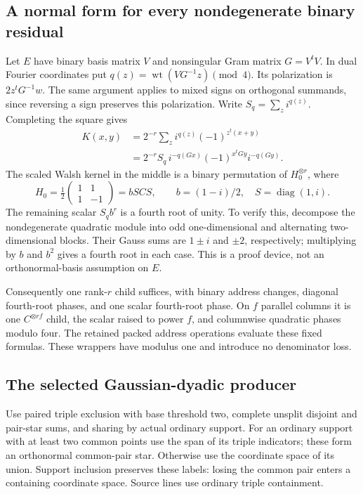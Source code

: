 \subsection{A normal form for every nondegenerate binary residual}
Let $E$ have binary basis matrix $V$ and nonsingular Gram matrix
$G=V^tV$. In dual Fourier coordinates put
$q(z)=\operatorname{wt}(VG^{-1}z)\pmod4$.
Its polarization is $2z^tG^{-1}w$. The same argument applies to mixed
signs on orthogonal summands, since reversing a sign preserves this
polarization. Write $S_q=\sum_z i^{q(z)}$. Completing the square gives
\[
\begin{aligned}
K(x,y)&=2^{-r}\sum_z i^{q(z)}(-1)^{z^t(x+y)}\\
 &=2^{-r}S_q\,i^{-q(Gx)}(-1)^{x^tGy}i^{-q(Gy)}.
\end{aligned}
\]
The scaled Walsh kernel in the middle is a binary permutation of
$H_0^{\otimes r}$, where
\[
 H_0=\tfrac12\begin{pmatrix}1&1\\1&-1\end{pmatrix}
     =bSCS,\qquad b=(1-i)/2,\quad S=\operatorname{diag}(1,i).
\]
The remaining scalar $S_qb^r$ is a fourth root of unity. To verify
this, decompose the nondegenerate quadratic module into odd
one-dimensional and alternating two-dimensional blocks. Their Gauss
sums are $1\pm i$ and $\pm2$, respectively; multiplying by $b$ and
$b^2$ gives a fourth root in each case. This is a proof device, not
an orthonormal-basis assumption on $E$.

Consequently one rank-$r$ child suffices, with binary address changes,
diagonal fourth-root phases, and one scalar fourth-root phase.
On $f$ parallel columns it is one $C^{\otimes rf}$ child, the scalar
raised to power $f$, and columnwise quadratic phases modulo four.
The retained packed address operations evaluate these fixed formulas.
These wrappers have modulus one and introduce no denominator loss.

\subsection{The selected Gaussian-dyadic producer}
Use paired triple exclusion with base threshold two, complete unsplit
disjoint and pair-star sums, and sharing by actual ordinary support.
For an ordinary support with at least two common points use the span
of its triple indicators; these form an orthonormal common-pair star.
Otherwise use the coordinate space of its union. Support inclusion
preserves these labels: losing the common pair enters a containing
coordinate space. Source lines use ordinary triple containment.

